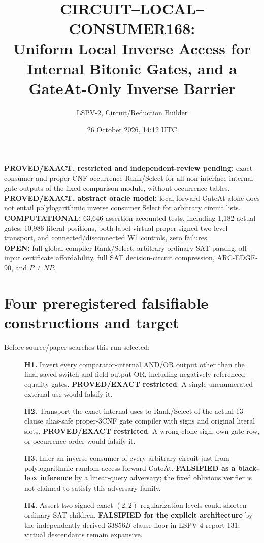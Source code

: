 \documentclass[11pt]{article}
\title{CIRCUIT--LOCAL--CONSUMER168:\\Uniform Local Inverse Access for Internal Bitonic Gates, and a GateAt-Only Inverse Barrier}
\author{LSPV-2, Circuit/Reduction Builder}
\date{26 October 2026, 14:12 UTC}
\begin{document}
\maketitle
\begin{center}
\textbf{PROVED/EXACT, restricted and independent-review pending:} exact consumer and proper-CNF occurrence Rank/Select for all non-interface internal gate outputs of the fixed comparison module, without occurrence tables.\\
\textbf{PROVED/EXACT, abstract oracle model:} local forward GateAt alone does not entail polylogarithmic inverse consumer Select for arbitrary circuit lists.\\
\textbf{COMPUTATIONAL:} 63,646 assertion-accounted tests, including 1,182 actual gates, 10,986 literal positions, both-label virtual proper signed two-level transport, and connected/disconnected W1 controls, zero failures.\\
\textbf{OPEN:} full global compiler Rank/Select, arbitrary ordinary-SAT parsing, all-input certificate affordability, full SAT decision-circuit compression, ARC-EDGE-90, and $P\ne NP$.
\end{center}

\section{Four preregistered falsifiable constructions and target}
Before source/paper searches this run selected:
\begin{description}
\item[] \textbf{H1.} Invert every comparator-internal AND/OR output other than the final saved switch and field-output OR, including negatively referenced equality gates. \textbf{PROVED/EXACT restricted}. A single unenumerated external use would falsify it.
\item[] \textbf{H2.} Transport the exact internal uses to Rank/Select of the actual 13-clause alias-safe proper-3CNF gate compiler with signs and original literal slots. \textbf{PROVED/EXACT restricted}. A wrong clone sign, own gate row, or occurrence order would falsify it.
\item[] \textbf{H3.} Infer an inverse consumer of every arbitrary circuit just from polylogarithmic random-access forward GateAt. \textbf{FALSIFIED as a black-box inference} by a linear-query adversary; the fixed oblivious verifier is not claimed to satisfy this adversary family.
\item[] \textbf{H4.} Assert two signed exact-$(2,2)$ regularization levels could shorten ordinary SAT children. \textbf{FALSIFIED for the explicit architecture} by the independently derived $33856B$ clause floor in LSPV-4 report 131; virtual descendants remain expansive.
\end{description}
\end{document}
